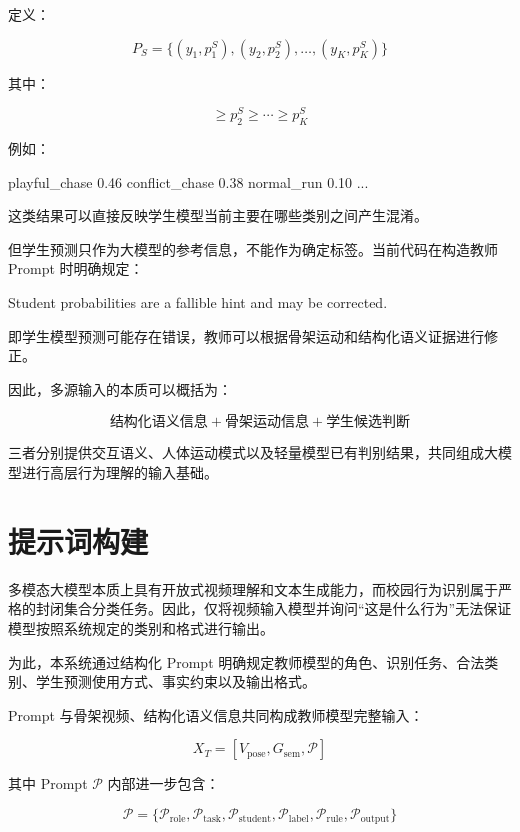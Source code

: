 定义：

\[
P_S=
\{
(y_1,p_1^S),
(y_2,p_2^S),
\ldots,
(y_K,p_K^S)
\}
\]

其中：

\[
\ge p_2^S\ge\cdots\ge p_K^S
\]

例如：

\begin{NotionCode}
playful_chase   0.46
conflict_chase  0.38
normal_run      0.10
...
\end{NotionCode}

这类结果可以直接反映学生模型当前主要在哪些类别之间产生混淆。

但学生预测只作为大模型的参考信息，不能作为确定标签。当前代码在构造教师 Prompt 时明确规定：

\begin{NotionCode}
Student probabilities are a fallible hint and may be corrected.
\end{NotionCode}

即学生模型预测可能存在错误，教师可以根据骨架运动和结构化语义证据进行修正。

因此，多源输入的本质可以概括为：

\[
\boxed{
\text{结构化语义信息}
+
\text{骨架运动信息}
+
\text{学生候选判断}
}
\]

三者分别提供交互语义、人体运动模式以及轻量模型已有判别结果，共同组成大模型进行高层行为理解的输入基础。

\section{提示词构建}

多模态大模型本质上具有开放式视频理解和文本生成能力，而校园行为识别属于严格的封闭集合分类任务。因此，仅将视频输入模型并询问“这是什么行为”无法保证模型按照系统规定的类别和格式进行输出。

为此，本系统通过结构化 Prompt 明确规定教师模型的角色、识别任务、合法类别、学生预测使用方式、事实约束以及输出格式。

Prompt 与骨架视频、结构化语义信息共同构成教师模型完整输入：

\[
X_T=
\left[
V_{\mathrm{pose}},
G_{\mathrm{sem}},
\mathcal P
\right]
\]

其中 Prompt \(\mathcal P\) 内部进一步包含：

\[
\mathcal P=
\{
\mathcal P_{\mathrm{role}},
\mathcal P_{\mathrm{task}},
\mathcal P_{\mathrm{student}},
\mathcal P_{\mathrm{label}},
\mathcal P_{\mathrm{rule}},
\mathcal P_{\mathrm{output}}
\}
\]

